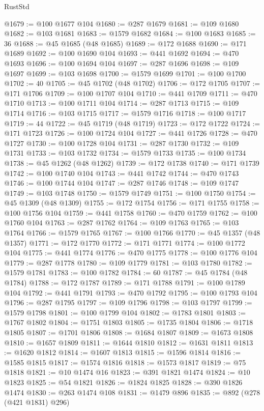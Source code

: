 \begin{lexlean}{RustStd}
\begin{coremodule}
@1679 := @100 @1677 @104
@1680 := @287 @1679
@1681 := @109 @1680
@1682 := @103 @1681
@1683 := @1579 @1682
@1684 := @100 @1683
@1685 := 36
@1688 := @45 @1685 (@48 @1685)
@1689 := @172 @1688
@1690 := @171 @1689
@1692 := @100 @1690 @104
@1693 := @441 @1692
@1694 := @470 @1693
@1696 := @100 @1694 @104
@1697 := @287 @1696
@1698 := @109 @1697
@1699 := @103 @1698
@1700 := @1579 @1699
@1701 := @100 @1700
@1702 := 40
@1705 := @45 @1702 (@48 @1702)
@1706 := @172 @1705
@1707 := @171 @1706
@1709 := @100 @1707 @104
@1710 := @441 @1709
@1711 := @470 @1710
@1713 := @100 @1711 @104
@1714 := @287 @1713
@1715 := @109 @1714
@1716 := @103 @1715
@1717 := @1579 @1716
@1718 := @100 @1717
@1719 := 44
@1722 := @45 @1719 (@48 @1719)
@1723 := @172 @1722
@1724 := @171 @1723
@1726 := @100 @1724 @104
@1727 := @441 @1726
@1728 := @470 @1727
@1730 := @100 @1728 @104
@1731 := @287 @1730
@1732 := @109 @1731
@1733 := @103 @1732
@1734 := @1579 @1733
@1735 := @100 @1734
@1738 := @45 @1262 (@48 @1262)
@1739 := @172 @1738
@1740 := @171 @1739
@1742 := @100 @1740 @104
@1743 := @441 @1742
@1744 := @470 @1743
@1746 := @100 @1744 @104
@1747 := @287 @1746
@1748 := @109 @1747
@1749 := @103 @1748
@1750 := @1579 @1749
@1751 := @100 @1750
@1754 := @45 @1309 (@48 @1309)
@1755 := @172 @1754
@1756 := @171 @1755
@1758 := @100 @1756 @104
@1759 := @441 @1758
@1760 := @470 @1759
@1762 := @100 @1760 @104
@1763 := @287 @1762
@1764 := @109 @1763
@1765 := @103 @1764
@1766 := @1579 @1765
@1767 := @100 @1766
@1770 := @45 @1357 (@48 @1357)
@1771 := @172 @1770
@1772 := @171 @1771
@1774 := @100 @1772 @104
@1775 := @441 @1774
@1776 := @470 @1775
@1778 := @100 @1776 @104
@1779 := @287 @1778
@1780 := @109 @1779
@1781 := @103 @1780
@1782 := @1579 @1781
@1783 := @100 @1782
@1784 := 60
@1787 := @45 @1784 (@48 @1784)
@1788 := @172 @1787
@1789 := @171 @1788
@1791 := @100 @1789 @104
@1792 := @441 @1791
@1793 := @470 @1792
@1795 := @100 @1793 @104
@1796 := @287 @1795
@1797 := @109 @1796
@1798 := @103 @1797
@1799 := @1579 @1798
@1801 := @100 @1799 @104
@1802 := @1783 @1801
@1803 := @1767 @1802
@1804 := @1751 @1803
@1805 := @1735 @1804
@1806 := @1718 @1805
@1807 := @1701 @1806
@1808 := @1684 @1807
@1809 := @1673 @1808
@1810 := @1657 @1809
@1811 := @1644 @1810
@1812 := @1631 @1811
@1813 := @1620 @1812
@1814 := @1607 @1813
@1815 := @1596 @1814
@1816 := @1585 @1815
@1817 := @1574 @1816
@1818 := @1573 @1817
@1819 := @75 @1818
@1821 := @10 @1474 @16
@1823 := @391 @1821 @1474
@1824 := @10 @1823
@1825 := @54 @1821
@1826 := @1824 @1825
@1828 := @390 @1826 @1474
@1830 := @263 @1474 @108
@1831 := @1479 @896
@1835 := @892 (@278 (@421 @1831) @296)

\end{coremodule}
\end{lexlean}
